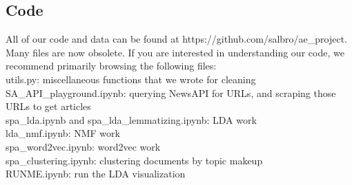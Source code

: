 \documentclass[11pt]{article}
\begin{document}
\subsection{Code}
All of our code and data can be found at https://github.com/salbro/ae\_project.  Many files are now obsolete. If you are interested in understanding our code, we recommend primarily browsing the following files: \\
utils.py: miscellaneous functions that we wrote for cleaning \\
SA\_API\_playground.ipynb: querying NewsAPI for URLs, and scraping those URLs to get articles \\
spa\_lda.ipynb and spa\_lda\_lemmatizing.ipynb: LDA work \\
lda\_nmf.ipynb: NMF work \\
spa\_word2vec.ipynb: word2vec work \\
spa\_clustering.ipynb: clustering documents by topic makeup \\
RUNME.ipynb: run the LDA visualization \\
\end{document}
